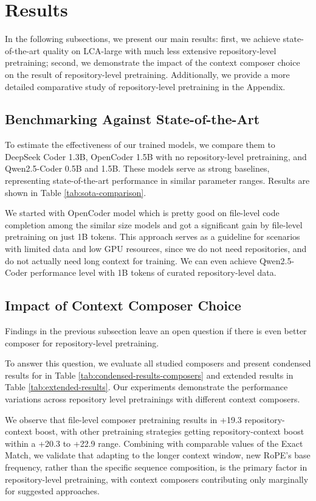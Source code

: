 \section{Results}
In the following subsections, we present our main results: first, we achieve state-of-the-art quality on LCA-large with much less extensive repository-level pretraining; second, we demonstrate the impact of the context composer choice on the result of repository-level pretraining. 
Additionally, we provide a more detailed comparative study of repository-level pretraining in the Appendix.


\subsection{Benchmarking Against State-of-the-Art}
To estimate the effectiveness of our trained models, we compare them to DeepSeek Coder 1.3B, OpenCoder 1.5B with no repository-level pretraining, and Qwen2.5-Coder 0.5B and 1.5B. These models serve as strong baselines, representing state-of-the-art performance in similar parameter ranges. Results are shown in Table \ref{tab:sota-comparison}. 



We started with OpenCoder model which is pretty good on file-level code completion among the similar size models and got a significant gain by file-level pretraining on just 1B tokens. This approach serves as a guideline for scenarios with limited data and low GPU resources, since we do not need repositories, and do not actually need long context for training. We can even achieve Qwen2.5-Coder performance level with 1B tokens of curated repository-level data.


\subsection{Impact of Context Composer Choice}
Findings in the previous subsection leave an open question if there is even better composer for repository-level pretraining.

To answer this question, we evaluate all studied composers and present condensed results for in Table \ref{tab:condensed-results-composers} and extended results in Table \ref{tab:extended-results}. Our experiments demonstrate the performance variations across repository level pretrainings with different context composers.



We observe that file-level composer pretraining results in +19.3 repository-context boost, with other pretraining strategies getting repository-context boost within a +20.3 to +22.9 range. Combining with comparable values of the Exact Match, we validate that adapting to the longer context window, \ie new RoPE's base frequency, rather than the specific sequence composition, is the primary factor in repository-level pretraining, with context composers contributing only marginally for suggested approaches.
